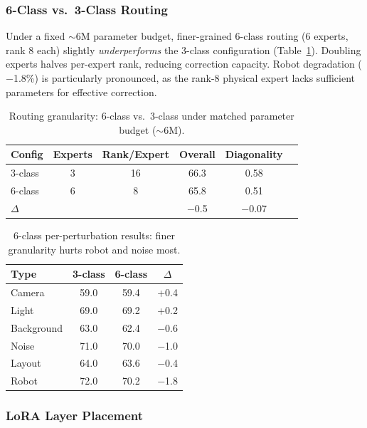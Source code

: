 \documentclass[letterpaper]{article}
\begin{document}
\subsubsection{6-Class vs.\ 3-Class Routing}

Under a fixed $\sim$6M parameter budget, finer-grained 6-class routing (6 experts, rank 8 each) slightly \emph{underperforms} the 3-class configuration (Table~\ref{tab:granularity}).
Doubling experts halves per-expert rank, reducing correction capacity.
Robot degradation ($-$1.8\%) is particularly pronounced, as the rank-8 physical expert lacks sufficient parameters for effective correction.

\begin{table}[h]
\centering
\caption{Routing granularity: 6-class vs.\ 3-class under matched parameter budget ($\sim$6M).}
\label{tab:granularity}
\begin{tabular}{lccccc}
\toprule
Config & Experts & Rank/Expert & Overall & Diagonality \\
\midrule
3-class & 3 & 16 & 66.3 & 0.58 \\
6-class & 6 & 8 & 65.8 & 0.51 \\
$\Delta$ & & & $-$0.5 & $-$0.07 \\
\bottomrule
\end{tabular}
\end{table}

\begin{table}[h]
\centering
\caption{6-class per-perturbation results: finer granularity hurts robot and noise most.}
\label{tab:6class_detail}
\begin{tabular}{lccc}
\toprule
Type & 3-class & 6-class & $\Delta$ \\
\midrule
Camera & 59.0 & 59.4 & +0.4 \\
Light & 69.0 & 69.2 & +0.2 \\
Background & 63.0 & 62.4 & $-$0.6 \\
Noise & 71.0 & 70.0 & $-$1.0 \\
Layout & 64.0 & 63.6 & $-$0.4 \\
Robot & 72.0 & 70.2 & $-$1.8 \\
\bottomrule
\end{tabular}
\end{table}

\subsubsection{LoRA Layer Placement}
\end{document}

